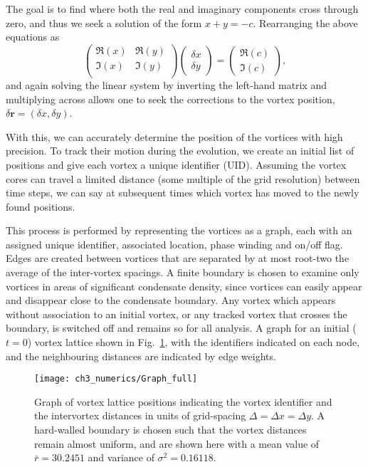 The goal is to find where both the real and imaginary components cross through zero, and thus we seek a solution of the form $x + y = -c$. Rearranging the above equations as
\begin{equation}\left(
    \begin{array}{cc}
        \Re(x) & \Re(y) \\
        \Im(x) & \Im(y) \\
    \end{array}\right)
    \left(
    \begin{array}{c}
        \delta x \\
        \delta y
    \end{array}\right)
    =
    \left(
    \begin{array}{c}
        \Re(c) \\
        \Im(c)
    \end{array}\right),
\end{equation}
and again solving the linear system by inverting the left-hand matrix and multiplying across allows one to seek the corrections to the vortex position, $\delta \mathbf{r} = (\delta x, \delta y )$.

 With this, we can accurately determine the position of the vortices with high precision. To track their motion during the evolution, we create an initial list of positions and give each vortex a unique identifier (UID). Assuming the vortex cores can travel a limited distance (some multiple of the grid resolution) between time steps, we can say at subsequent times which vortex has moved to the newly found positions.

 This process is performed by representing the vortices as a graph, each with an assigned unique identifier, associated location, phase winding and on/off flag. Edges are created between vortices that are separated by at most root-two the average of the inter-vortex spacings. A finite boundary is chosen to examine only vortices in areas of significant condensate density, since vortices can easily appear and disappear close to the condensate boundary. Any vortex which appears without association to an initial vortex, or any tracked vortex that crosses the boundary, is switched off and remains so for all analysis. A graph for an initial ($t=0$) vortex lattice shown in Fig.~\ref{fig:graphit}, with the identifiers indicated on each node, and the neighbouring distances are indicated by edge weights. %

 \begin{figure}
     \centering
     \texttt{[image: ch3\_numerics/Graph\_full]}
     \caption{Graph of vortex lattice positions indicating the vortex identifier and the intervortex distances in units of grid-spacing $\Delta= \Delta x = \Delta y$. A hard-walled boundary is chosen such that the vortex distances remain almost uniform, and are shown here with a mean value of $\bar{r} = 30.2451$ and variance of $\sigma^2 = 0.16118$.}
     \label{fig:graphit}
 \end{figure}
